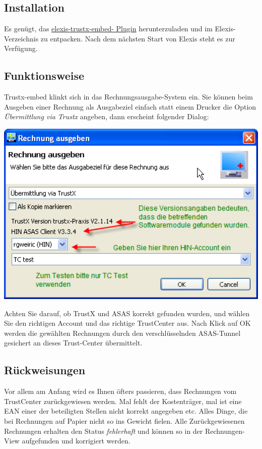 \subsection{Installation}
Es genügt, das \href{http://www.elexis.ch/files/elexis-trustx-embed.zip}{elexis-trustx-embed- Plugin} herunterzuladen und im Elexis-Verzeichnis zu entpacken. Nach dem nächsten Start von Elexis steht es zur Verfügung.

\subsection{Funktionsweise}
Trustx-embed klinkt sich in das Rechnungsausgabe-System ein. Sie können beim Ausgeben einer Rechnung als Ausgabeziel einfach statt einem Drucker die Option \textit{Übermittlung via Trustx} angeben, dann erscheint folgender Dialog:

\includegraphics[width=6in]{images/trustx.png}

Achten Sie darauf, ob TrustX und ASAS korrekt gefunden wurden, und wählen Sie den richtigen Account und das richtige TrustCenter aus. Nach Klick auf OK werden die gewählten Rechnungen durch den verschlüsselnden ASAS-Tunnel gesichert an dieses Trust-Center übermittelt.

\subsection{Rückweisungen}
Vor allem am Anfang wird es Ihnen öfters passieren, dass Rechnungen vom TrustCenter zurückgewiesen werden. Mal fehlt der Kostenträger, mal ist eine EAN einer der beteiligten Stellen nicht korrekt angegeben etc. Alles Dinge, die bei Rechnungen auf Papier nicht so ins Gewicht fielen. Alle Zurückgewiesenen Rechnungen erhalten den Status \textit{fehlerhaft} und können so in der Rechnungen-View aufgefunden und korrigiert werden.

